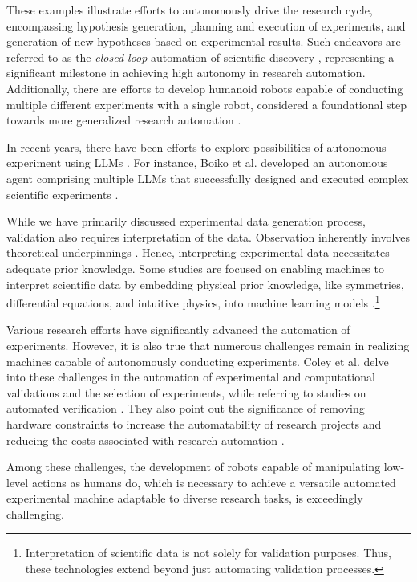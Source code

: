 These examples illustrate efforts to autonomously drive the research cycle, encompassing hypothesis generation, planning and execution of experiments, and generation of new hypotheses based on experimental results. Such endeavors are referred to as the \textit{closed-loop} automation of scientific discovery \cite{zenil2023future}, representing a significant milestone in achieving high autonomy in research automation. Additionally, there are efforts to develop humanoid robots capable of conducting multiple different experiments with a single robot, considered a foundational step towards more generalized research automation \cite{yachie2017robotic}.

In recent years, there have been efforts to explore possibilities of autonomous experiment using LLMs \cite{boiko2023emergent,qin2023gpt,charness2023generation}. For instance, Boiko et al. developed an autonomous agent comprising multiple LLMs that successfully designed and executed complex scientific experiments \cite{boiko2023emergent}.

While we have primarily discussed experimental data generation process,  validation also requires interpretation of the data. Observation inherently involves theoretical underpinnings \cite{hanson1965patterns}. Hence, interpreting experimental data necessitates adequate prior knowledge. Some studies are focused on enabling machines to interpret scientific data by embedding physical prior knowledge, like symmetries, differential equations, and intuitive physics, into machine learning models \cite{hao2022physics,karniadakis2021physics}.\footnote{
Interpretation of scientific data is not solely for validation purposes. Thus, these technologies extend beyond just automating validation processes.
}

Various research efforts have significantly advanced the automation of experiments. However, it is also true that numerous challenges remain in realizing machines capable of autonomously conducting experiments. Coley et al. delve into these challenges in the automation of experimental and computational validations and the selection of experiments, while referring to studies on automated verification \cite{coley2020autonomousII}. They also point out the significance of removing hardware constraints to increase the automatability of research projects and reducing the costs associated with research automation \cite{coley2020autonomousII}.

Among these challenges, the development of robots capable of manipulating low-level actions as humans do, which is necessary to achieve a versatile automated experimental machine adaptable to diverse research tasks, is exceedingly challenging. 

